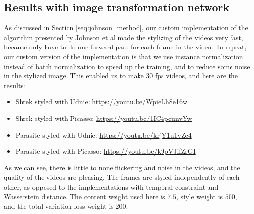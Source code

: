 \subsection{Results with image transformation network}
\label{seq:johnson_result}
As discussed in Section \ref{seq:johnson_method}, our custom implementation of the algorithm presented by Johnson et al \cite{Johnson:1} made the stylizing of the videos very fast, because only have to do one forward-pass for each frame in the video. To repeat, our custom version of the implementation is that we use instance normalization instead of batch normalization to speed up the training, and to reduce some noise in the stylized image. This enabled us to make 30 fps videos, and here are the results:
\begin{itemize}
\item{Shrek styled with Udnie: \url{https://youtu.be/WpieLh8e16w}}
\item{Shrek styled with Picasso: \url{https://youtu.be/1IC4peunvYw}}
\item{Parasite styled with Udnie: \url{https://youtu.be/krjY1u1vZc4}}
\item{Parasite styled with Picasso: \url{https://youtu.be/k9pVJifZrGI}}
\end{itemize}
As we can see, there is little to none flickering and noise in the videos, and the quality of the videos are pleasing. The frames are styled independently of each other, as opposed to the implementations with temporal constraint and Wasserstein distance. The content weight used here is $7.5$, style weight is $500,$ and the total variation loss weight is $200$.